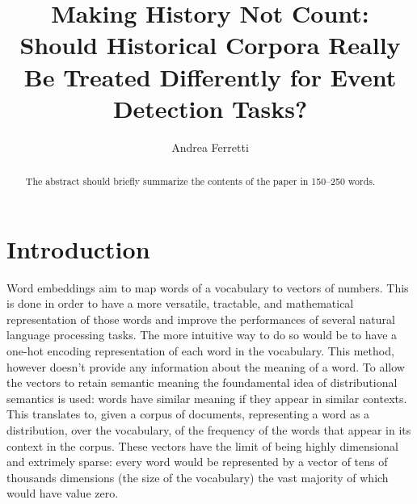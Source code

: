 \documentclass[runningheads]{llncs}
\begin{document}
%
\title{Making History Not Count:\\
Should Historical Corpora Really Be Treated Differently for Event Detection Tasks?}

%
%
\author{Andrea Ferretti}
%
%
%
\maketitle              %
%
\begin{abstract}
The abstract should briefly summarize the contents of the paper in
150--250 words.

\end{abstract}
%
%
%
\section{Introduction}
Word embeddings aim to map words of a vocabulary to vectors of numbers. This is done in order to have a more versatile, tractable, and mathematical representation of those words and improve the performances of several natural language processing tasks. The more intuitive way to do so would be to have a one-hot encoding representation of each word in the vocabulary. This method, however doesn't provide any information about the meaning of a word. To allow the vectors to retain semantic meaning the foundamental idea of distributional semantics is used: words have similar meaning if they appear in similar contexts. This translates to, given a corpus of documents, representing a word as a distribution, over the vocabulary, of the frequency of the words that appear in its context in the corpus. These vectors have the limit of being highly dimensional and extrimely sparse: every word would be represented by a vector of tens of thousands dimensions (the size of the vocabulary) the vast majority of which would have value zero.
\end{document}

